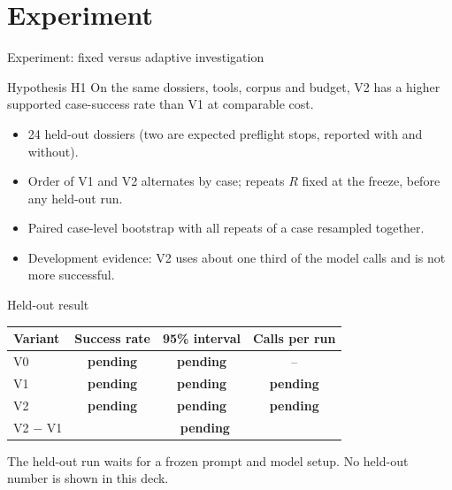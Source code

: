 \documentclass[aspectratio=169,10pt]{beamer}
\begin{document}
\section{Experiment}
\begin{frame}{Experiment: fixed versus adaptive investigation}
\begin{block}{Hypothesis H1}
On the same dossiers, tools, corpus and budget, V2 has a higher supported case-success rate than V1 at comparable cost.
\end{block}
\begin{itemize}
\item 24 held-out dossiers (two are expected preflight stops, reported with and without).
\item Order of V1 and V2 alternates by case; repeats $R$ fixed at the freeze, before any held-out run.
\item Paired case-level bootstrap with all repeats of a case resampled together.
\item Development evidence: V2 uses about one third of the model calls and is not more successful.
\end{itemize}
\end{frame}

\begin{frame}{Held-out result}
\centering
\begin{tabularx}{0.8\linewidth}{@{}l c c c@{}}
\toprule
\textbf{Variant} & \textbf{Success rate} & \textbf{95\% interval} & \textbf{Calls per run} \\ \midrule
V0 & {\color{pendingorange}\textbf{pending}} & {\color{pendingorange}\textbf{pending}} & -- \\
V1 & {\color{pendingorange}\textbf{pending}} & {\color{pendingorange}\textbf{pending}} & {\color{pendingorange}\textbf{pending}} \\
V2 & {\color{pendingorange}\textbf{pending}} & {\color{pendingorange}\textbf{pending}} & {\color{pendingorange}\textbf{pending}} \\
V2 $-$ V1 & \multicolumn{3}{c}{{\color{pendingorange}\textbf{pending}}} \\
\bottomrule
\end{tabularx}

\medskip\small The held-out run waits for a frozen prompt and model setup. No held-out number is shown in this deck.
\end{frame}
\end{document}

